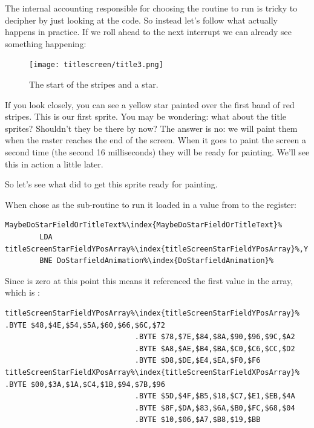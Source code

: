 The internal accounting responsible for choosing the routine to run is tricky to decipher by just looking at the code. So
instead let's follow what actually happens in practice. If we roll ahead to the next interrupt we can already see something
happening:

\begin{figure}[H]
    \centering
      \texttt{[image: titlescreen/title3.png]}%
\caption{The start of the stripes and a star.}
\end{figure}

If you look closely, you can see a yellow star painted over the first band of red stripes. This is our first sprite. You may
be wondering: what about the title sprites? Shouldn't they be there by now? The answer is no: we will paint them when the
raster reaches the end of the screen. When it goes to paint the screen a second time (the second 16 milliseconds) they
will be ready for painting. We'll see this in action a little later.

So let's see what  did to get this sprite ready for painting.

When  chose  as the sub-routine to run it loaded in a value
from  to the  register: 

\begin{lstlisting}[escapechar=\%]
MaybeDoStarFieldOrTitleText%\index{MaybeDoStarFieldOrTitleText}%   
        LDA titleScreenStarFieldYPosArray%\index{titleScreenStarFieldYPosArray}%,Y
        BNE DoStarfieldAnimation%\index{DoStarfieldAnimation}%
\end{lstlisting}

Since  is zero at this point this means it referenced the first value in the array, which is :
\begin{lstlisting}[escapechar=\%]
titleScreenStarFieldYPosArray%\index{titleScreenStarFieldYPosArray}% .BYTE $48,$4E,$54,$5A,$60,$66,$6C,$72
                              .BYTE $78,$7E,$84,$8A,$90,$96,$9C,$A2
                              .BYTE $A8,$AE,$B4,$BA,$C0,$C6,$CC,$D2
                              .BYTE $D8,$DE,$E4,$EA,$F0,$F6
titleScreenStarFieldXPosArray%\index{titleScreenStarFieldXPosArray}% .BYTE $00,$3A,$1A,$C4,$1B,$94,$7B,$96
                              .BYTE $5D,$4F,$B5,$18,$C7,$E1,$EB,$4A
                              .BYTE $8F,$DA,$83,$6A,$B0,$FC,$68,$04
                              .BYTE $10,$06,$A7,$B8,$19,$BB
\end{lstlisting}

